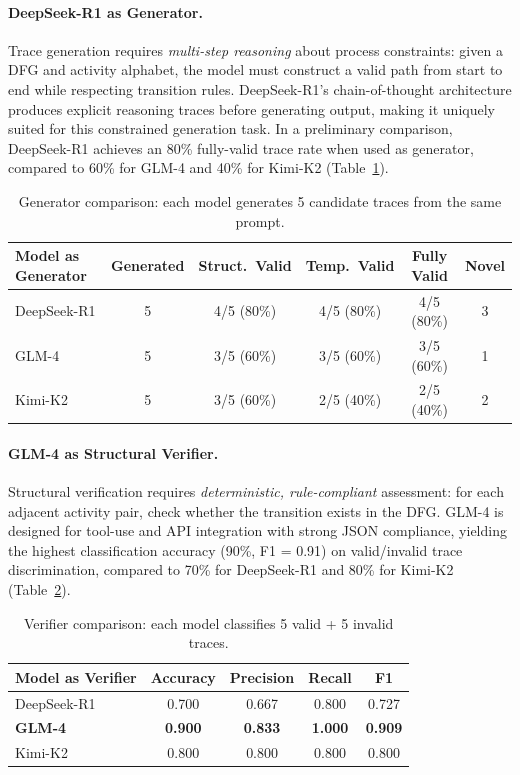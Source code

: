 \documentclass[11pt,a4paper]{article}
\begin{document}
\paragraph{DeepSeek-R1 as Generator.} Trace generation requires \emph{multi-step reasoning} about process constraints: given a DFG and activity alphabet, the model must construct a valid path from start to end while respecting transition rules. DeepSeek-R1's chain-of-thought architecture produces explicit reasoning traces before generating output, making it uniquely suited for this constrained generation task. In a preliminary comparison, DeepSeek-R1 achieves an 80\% fully-valid trace rate when used as generator, compared to 60\% for GLM-4 and 40\% for Kimi-K2 (Table~\ref{tab:gen_comp}).

\begin{table}[t]
\centering
\caption{Generator comparison: each model generates 5 candidate traces from the same prompt.}
\label{tab:gen_comp}
\begin{tabular}{lccccc}
\toprule
\textbf{Model as Generator} & \textbf{Generated} & \textbf{Struct.\ Valid} & \textbf{Temp.\ Valid} & \textbf{Fully Valid} & \textbf{Novel} \\
\midrule
DeepSeek-R1 & 5 & 4/5 (80\%) & 4/5 (80\%) & 4/5 (80\%) & 3 \\
GLM-4 & 5 & 3/5 (60\%) & 3/5 (60\%) & 3/5 (60\%) & 1 \\
Kimi-K2 & 5 & 3/5 (60\%) & 2/5 (40\%) & 2/5 (40\%) & 2 \\
\bottomrule
\end{tabular}
\end{table}

\paragraph{GLM-4 as Structural Verifier.} Structural verification requires \emph{deterministic, rule-compliant} assessment: for each adjacent activity pair, check whether the transition exists in the DFG. GLM-4 is designed for tool-use and API integration with strong JSON compliance, yielding the highest classification accuracy (90\%, F1 = 0.91) on valid/invalid trace discrimination, compared to 70\% for DeepSeek-R1 and 80\% for Kimi-K2 (Table~\ref{tab:ver_comp}).

\begin{table}[t]
\centering
\caption{Verifier comparison: each model classifies 5 valid + 5 invalid traces.}
\label{tab:ver_comp}
\begin{tabular}{lcccc}
\toprule
\textbf{Model as Verifier} & \textbf{Accuracy} & \textbf{Precision} & \textbf{Recall} & \textbf{F1} \\
\midrule
DeepSeek-R1 & 0.700 & 0.667 & 0.800 & 0.727 \\
\textbf{GLM-4} & \textbf{0.900} & \textbf{0.833} & \textbf{1.000} & \textbf{0.909} \\
Kimi-K2 & 0.800 & 0.800 & 0.800 & 0.800 \\
\bottomrule
\end{tabular}
\end{table}
\end{document}
